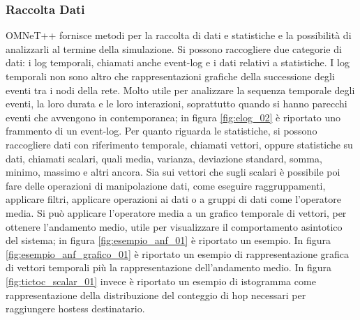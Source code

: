 \subsubsection{Raccolta Dati}
OMNeT++ fornisce metodi per la raccolta di dati e statistiche e la possibilità di analizzarli al termine della simulazione. Si possono raccogliere due categorie di dati: i log temporali, chiamati anche event-log e i dati relativi a statistiche. I log temporali non sono altro che rappresentazioni grafiche della successione degli eventi tra i nodi della rete. Molto utile per analizzare la sequenza temporale degli eventi, la loro durata e le loro interazioni, soprattutto quando si hanno parecchi eventi che avvengono in contemporanea; in figura \ref{fig:elog_02} è riportato uno frammento di un event-log. Per quanto riguarda le statistiche, si possono raccogliere dati con riferimento temporale, chiamati vettori, oppure statistiche su dati, chiamati scalari, quali media, varianza, deviazione standard, somma, minimo, massimo e altri ancora. Sia sui vettori che sugli scalari è possibile poi fare delle operazioni di manipolazione dati, come eseguire raggruppamenti, applicare filtri, applicare operazioni ai dati o a gruppi di dati come l'operatore media. Si può applicare l'operatore media a un grafico temporale di vettori, per ottenere l'andamento medio, utile per visualizzare il comportamento asintotico del sistema; in figura \ref{fig:esempio_anf_01} è riportato un esempio. In figura \ref{fig:esempio_anf_grafico_01} è riportato un esempio di rappresentazione grafica di vettori temporali più la rappresentazione dell'andamento medio. In figura \ref{fig:tictoc_scalar_01} invece è riportato un esempio di istogramma come rappresentazione della distribuzione del conteggio di hop necessari per raggiungere hostess destinatario.

